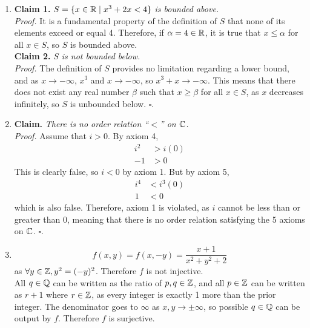 \documentclass[../MATH145.tex]{subfiles}
\begin{document}
		\begin{enumerate}
			\item
				\textbf{Claim 1.} \textit{\(S = \{x \in \mathbb{R} \mid x^3 + 2x < 4\}\) is bounded above.} \\
					\textit{Proof.} 
						It is a fundamental property of the definition of \(S\) that none of its elements exceed or equal 4. Therefore, if \(\alpha = 4 \in \mathbb{R}\), it is true that \(x \le \alpha\) for all \(x \in S\), so \(S\) is bounded above. \\
				\textbf{Claim 2.} \textit{\(S\) is not bounded below.} \\
					\textit{Proof.} The definition of \(S\) provides no limitation regarding a lower bound, and as \(x \to -\infty\), \(x^3\) and \(x \to -\infty\), so \(x^3 + x \to -\infty\). This means that there does not exist any real number \(\beta\) such that \(x \ge \beta\) for all \(x \in S\), as \(x\) decreases infinitely, so \(S\) is unbounded below. \(\square\).
			\item
				\textbf{Claim.} \textit{There is no order relation \enquote{\(<\)} on \(\mathbb{C}\).} \\
					\textit{Proof.} 
						Assume that \(i > 0\). By axiom 4,
							\begin{align*}
								i^2 &> i(0) \\
								-1 &> 0
							\end{align*}
						This is clearly false, so \(i < 0\) by axiom 1. But by axiom 5,
							\begin{align*}
								i^4 &< i^3(0) \\
								1 &< 0
							\end{align*}
						which is also false. Therefore, axiom 1 is violated, as \(i\) cannot be less than or greater than 0, meaning that there is no order relation satisfying the 5 axioms on \(\mathbb{C}\). \(\square\).
			\item
				\begin{tasks}
					\task
						\[
							f(x, y) = f(x, -y)	
								= \frac{x + 1}{x^2 + y^2 + 2}
						\]
						as \(\forall y \in \mathbb{Z}, y^2 = (-y)^2\). Therefore \(f\) is not injective. \\
						All \(q \in \mathbb{Q}\) can be written as the ratio of \(p,q  \in \mathbb{Z}\), and all \(p \in \mathbb{Z}\) can be written as \(r + 1\) where \(r \in \mathbb{Z}\), as every integer is exactly 1 more than the prior integer. The denominator goes to \(\infty\) as \(x, y \to \pm\infty\), so possible \(q \in \mathbb{Q}\) can be output by \(f\). Therefore \(f\) is surjective.
					\task

\end{tasks}
\end{enumerate}
\end{document}
